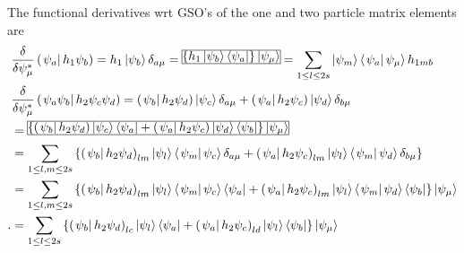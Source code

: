 \documentclass[aps,preprint]{revtex4}%
\begin{document}
The functional derivatives wrt GSO's of the one and two particle matrix
elements are
\begin{align}
&  \frac{\delta}{\delta\psi_{\mu}^{\ast}}\left(  \left.  \psi_{a}\right\vert
h_{1}\psi_{b}\right)  =h_{1}\left\vert \psi_{b}\right\rangle \delta_{a\mu
}=\frame{$\left\{  h_1\left\vert \psi_b\right\rangle \left\langle
\psi_a\right\vert \right\}  \left\vert \psi_\mu\right\rangle $}=\sum_{1\leq
l\leq2s}\left\vert \psi_{m}\right\rangle \left\langle \left.  \psi
_{a}\right\vert \psi_{\mu}\right\rangle h_{1mb}\nonumber\\
&  \frac{\delta}{\delta\psi_{\mu}^{\ast}}\left(  \left.  \psi_{a}\psi
_{b}\right\vert h_{2}\psi_{c}\psi_{d}\right)  =\left(  \left.  \psi
_{b}\right\vert h_{2}\psi_{d}\right)  \left\vert \psi_{c}\right\rangle
\delta_{a\mu}+\left(  \left.  \psi_{a}\right\vert h_{2}\psi_{c}\right)
\left\vert \psi_{d}\right\rangle \delta_{b\mu}\nonumber\\
&  =\frame{$\left\{  \left(  \left.  \psi_b\right\vert h_2\psi_d\right)
\left\vert \psi_c\right\rangle \left\langle \psi_a\right\vert +\left(  \left.
\psi_a\right\vert h_2\psi_c\right)  \left\vert \psi_d\right\rangle
\left\langle \psi_b\right\vert \right\}  \left\vert \psi_\mu\right\rangle
$}\nonumber\\
&  =\sum_{1\leq l,m\leq2s}\left\{  \left(  \left.  \psi_{b}\right\vert
h_{2}\psi_{d}\right)  _{lm}\left\vert \psi_{l}\right\rangle \left\langle
\left.  \psi_{m}\right\vert \psi_{c}\right\rangle \delta_{a\mu}+\left(
\left.  \psi_{a}\right\vert h_{2}\psi_{c}\right)  _{lm}\left\vert \psi
_{l}\right\rangle \left\langle \left.  \psi_{m}\right\vert \psi_{d}%
\right\rangle \delta_{b\mu}\right\} \nonumber\\
&  =\sum_{1\leq l,m\leq2s}\left\{  \left(  \left.  \psi_{b}\right\vert
h_{2}\psi_{d}\right)  _{lm}\left\vert \psi_{l}\right\rangle \left\langle
\left.  \psi_{m}\right\vert \psi_{c}\right\rangle \left\langle \psi
_{a}\right\vert +\left(  \left.  \psi_{a}\right\vert h_{2}\psi_{c}\right)
_{lm}\left\vert \psi_{l}\right\rangle \left\langle \left.  \psi_{m}\right\vert
\psi_{d}\right\rangle \left\langle \psi_{b}\right\vert \right\}  \left\vert
\psi_{\mu}\right\rangle \nonumber\\
.  &  =\sum_{1\leq l\leq2s}\left\{  \left(  \left.  \psi_{b}\right\vert
h_{2}\psi_{d}\right)  _{lc}\left\vert \psi_{l}\right\rangle \left\langle
\psi_{a}\right\vert +\left(  \left.  \psi_{a}\right\vert h_{2}\psi_{c}\right)
_{ld}\left\vert \psi_{l}\right\rangle \left\langle \psi_{b}\right\vert
\right\}  \left\vert \psi_{\mu}\right\rangle
\end{align}%
\end{document}
